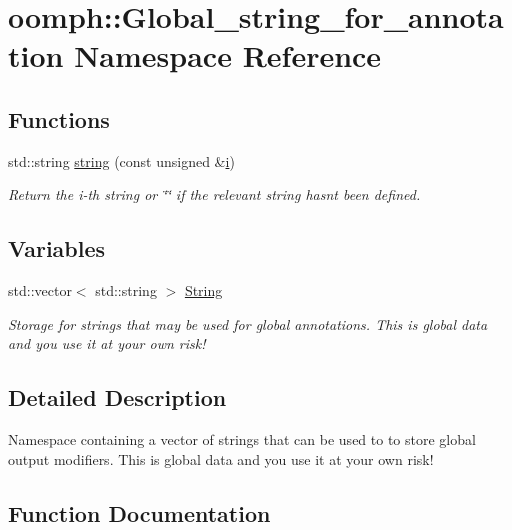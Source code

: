 \hypertarget{namespaceoomph_1_1Global__string__for__annotation}{}\section{oomph\+:\+:Global\+\_\+string\+\_\+for\+\_\+annotation Namespace Reference}
\label{namespaceoomph_1_1Global__string__for__annotation}
\subsection*{Functions}
\begin{DoxyCompactItemize}
\item 
std\+::string \hyperlink{namespaceoomph_1_1Global__string__for__annotation_ac5379de2fa7fe44f2cb31785fc208135}{string} (const unsigned \&\hyperlink{cfortran_8h_adb50e893b86b3e55e751a42eab3cba82}{i})
\begin{DoxyCompactList}\small\item\em Return the i-\/th string or \char`\"{}\char`\"{} if the relevant string hasn\textquotesingle{}t been defined. \end{DoxyCompactList}\end{DoxyCompactItemize}
\subsection*{Variables}
\begin{DoxyCompactItemize}
\item 
std\+::vector$<$ std\+::string $>$ \hyperlink{namespaceoomph_1_1Global__string__for__annotation_a3e4fe39c6055ee6fe5c367533905591b}{String}
\begin{DoxyCompactList}\small\item\em Storage for strings that may be used for global annotations. This is global data and you use it at your own risk! \end{DoxyCompactList}\end{DoxyCompactItemize}


\subsection{Detailed Description}
Namespace containing a vector of strings that can be used to to store global output modifiers. This is global data and you use it at your own risk! 

\subsection{Function Documentation}
\mbox{\label{namespaceoomph_1_1Global__string__for__annotation_ac5379de2fa7fe44f2cb31785fc208135}} 
